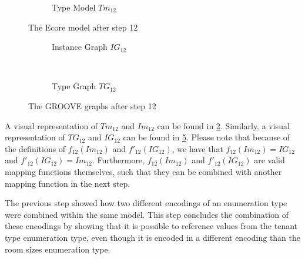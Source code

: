 \begin{figure}[p]
\begin{subfigure}{0.98\textwidth}
        \caption{Type Model $Tm_{12}$}
        \label{fig:application:building_the_model:tenant_types:ecore:type_model}
    \end{subfigure}
    \caption{The Ecore model after step 12}
    \label{fig:application:building_the_model:tenant_types:ecore}
\end{figure}

\begin{figure}[p]
    \centering
    \begin{subfigure}{0.98\textwidth}
        \centering
        
        \caption{Instance Graph $IG_{12}$}
        \label{fig:application:building_the_model:tenant_types:groove:instance_graph}
    \end{subfigure}
    \\
    \begin{subfigure}{0.98\textwidth}
        \centering
        
        \caption{Type Graph $TG_{12}$}
        \label{fig:application:building_the_model:tenant_types:groove:type_graph}
    \end{subfigure}
    \caption{The GROOVE graphs after step 12}
    \label{fig:application:building_the_model:tenant_types:groove}
\end{figure}

A visual representation of $Tm_{12}$ and $Im_{12}$ can be found in \cref{fig:application:building_the_model:tenant_types:ecore}. Similarly, a visual representation of $TG_{12}$ and $IG_{12}$ can be found in \cref{fig:application:building_the_model:tenant_types:groove}. Please note that because of the definitions of $f_{12}(Im_{12})$ and $f'_{12}(IG_{12})$, we have that $f_{12}(Im_{12}) = IG_{12}$ and $f'_{12}(IG_{12}) = Im_{12}$. Furthermore, $f_{12}(Im_{12})$ and $f'_{12}(IG_{12})$ are valid mapping functions themselves, such that they can be combined with another mapping function in the next step.

The previous step showed how two different encodings of an enumeration type were combined within the same model. This step concludes the combination of these encodings by showing that it is possible to reference values from the tenant type enumeration type, even though it is encoded in a different encoding than the room sizes enumeration type.

\afterpage{\FloatBarrier}